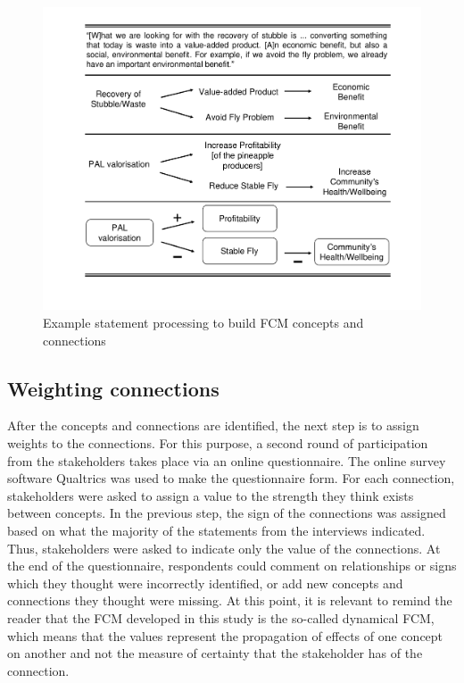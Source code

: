 \begin{figure}[H]
\caption{Example statement processing to build FCM concepts and connections}
\label{process_fcm}
\centering
\includegraphics[width=\textwidth]{fig/processFCM.pdf}
\end{figure}


\subsection{Weighting connections}

After the concepts and connections are identified, the next step is to assign weights to the connections. For this purpose, a second round of participation from the stakeholders takes place via an online questionnaire. The online survey software Qualtrics was used to make the questionnaire form. For each connection, stakeholders were asked to assign a value to the strength they think exists between concepts. In the previous step, the sign of the connections was assigned based on what the majority of the statements from the interviews indicated. Thus, stakeholders were asked to indicate only the value of the connections. At the end of the questionnaire, respondents could comment on relationships or signs which they thought were incorrectly identified, or add new concepts and connections they thought were missing. At this point, it is relevant to remind the reader that the FCM developed in this study is the so-called dynamical FCM, which means that the values represent the propagation of effects of one concept on another and not the measure of certainty that the stakeholder has of the connection. 

